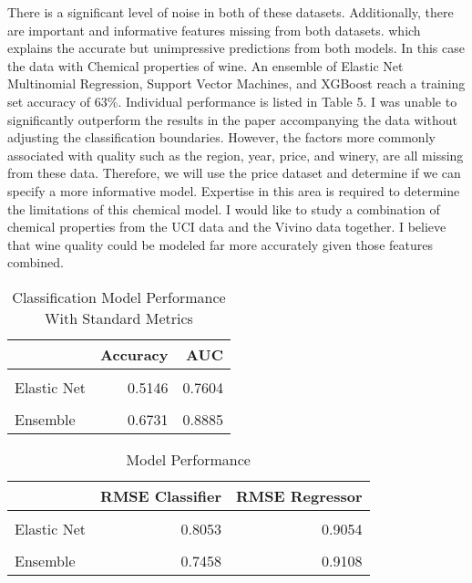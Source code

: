 \documentclass[16pt,twocolumn,letterpaper,titlepage]{article}
\begin{document}
There is a significant level of noise in both of these datasets. Additionally, there are important and informative features missing from both datasets. which explains the accurate but unimpressive predictions from both models. In this case the data with Chemical properties of wine. An ensemble of Elastic Net Multinomial Regression, Support Vector Machines, and XGBoost reach a training set accuracy of 63\%. Individual performance is listed in Table 5. I was unable to significantly outperform the results in the paper accompanying the data without adjusting the classification boundaries. However, the factors more commonly associated with quality such as the region, year, price, and winery, are all missing from these data. Therefore, we will use the price dataset and determine if we can specify a more informative model. Expertise in this area is required to determine the limitations of this chemical model. I would like to study a combination of chemical properties from the UCI data and the Vivino data together. I believe that wine quality could be modeled far more accurately given those features combined.


\begin{table}[!h]

\caption{Classification Model Performance With Standard Metrics}
\centering
\begin{tabular}[t]{lrr}
\toprule
  & Accuracy & AUC\\
\midrule
\cellcolor{gray!6}{XGBoost} & \cellcolor{gray!6}{0.6377} & \cellcolor{gray!6}{0.8361}\\
Elastic Net & 0.5146 & 0.7604\\
\cellcolor{gray!6}{SVM} & \cellcolor{gray!6}{0.5146} & \cellcolor{gray!6}{0.7584}\\
Ensemble & 0.6731 & 0.8885\\
\bottomrule
\end{tabular}
\end{table}


\begin{table}[!h]

\caption{Model Performance}
\centering
\begin{tabular}[t]{lrr}
\toprule
  & RMSE Classifier & RMSE Regressor\\
\midrule
\cellcolor{gray!6}{XGBoost} & \cellcolor{gray!6}{0.7190} & \cellcolor{gray!6}{0.9265}\\
Elastic Net & 0.8053 & 0.9054\\
\cellcolor{gray!6}{SVM} & \cellcolor{gray!6}{0.8053} & \cellcolor{gray!6}{0.9160}\\
Ensemble & 0.7458 & 0.9108\\
\bottomrule
\end{tabular}
\end{table}
\end{document}
